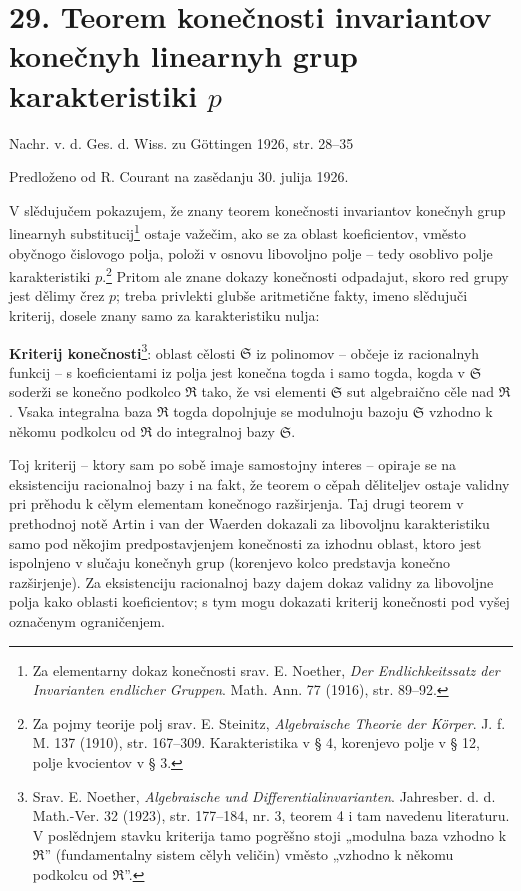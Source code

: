 \documentclass[11pt]{article}
\begin{document}
\section*{29. Teorem konečnosti invariantov konečnyh linearnyh grup karakteristiki $p$}

\begin{center}
Nachr. v. d. Ges. d. Wiss. zu Göttingen 1926, str. 28--35
\end{center}

Predloženo od R. Courant na zasědanju 30. julija 1926.

V slědujučem pokazujem, že znany teorem konečnosti invariantov konečnyh grup linearnyh substitucij\footnote{Za elementarny dokaz konečnosti srav. E. Noether, \emph{Der Endlichkeitssatz der Invarianten endlicher Gruppen}. Math. Ann. 77 (1916), str. 89--92.} ostaje važečim, ako se za oblast koeficientov, vměsto obyčnogo čislovogo polja, položi v osnovu libovoljno polje -- tedy osoblivo polje karakteristiki $p$.\footnote{Za pojmy teorije polj srav. E. Steinitz, \emph{Algebraische Theorie der Körper}. J. f. M. 137 (1910), str. 167--309. Karakteristika v § 4, korenjevo polje v § 12, polje kvocientov v § 3.} Pritom ale znane dokazy konečnosti odpadajut, skoro red grupy jest dělimy črez $p$; treba privlekti glubše aritmetične fakty, imeno slědujuči kriterij, dosele znany samo za karakteristiku nulja:

\textbf{Kriterij konečnosti}\footnote{Srav. E. Noether, \emph{Algebraische und Differentialinvarianten}. Jahresber. d. d. Math.-Ver. 32 (1923), str. 177--184, nr. 3, teorem 4 i tam navedenu literaturu. V poslědnjem stavku kriterija tamo pogrěšno stoji „modulna baza vzhodno k $\mathfrak R$” (fundamentalny sistem cělyh veličin) vměsto „vzhodno k někomu podkolcu od $\mathfrak R$”.}: oblast cělosti $\mathfrak S$ iz polinomov -- občeje iz racionalnyh funkcij -- s koeficientami iz polja jest konečna togda i samo togda, kogda v $\mathfrak S$ soderži se konečno podkolco $\mathfrak R$ tako, že vsi elementi $\mathfrak S$ sut algebraično cěle nad $\mathfrak R$. Vsaka integralna baza $\mathfrak R$ togda dopolnjuje se modulnoju bazoju $\mathfrak S$ vzhodno k někomu podkolcu od $\mathfrak R$ do integralnoj bazy $\mathfrak S$.

Toj kriterij -- ktory sam po sobě imaje samostojny interes -- opiraje se na eksistenciju racionalnoj bazy i na fakt, že teorem o cěpah děliteljev ostaje validny pri prěhodu k cělym elementam konečnogo razširjenja. Taj drugi teorem v prethodnoj notě Artin i van der Waerden dokazali za libovoljnu karakteristiku samo pod někojim predpostavjenjem konečnosti za izhodnu oblast, ktoro jest ispolnjeno v slučaju konečnyh grup (korenjevo kolco predstavja konečno razširjenje). Za eksistenciju racionalnoj bazy dajem dokaz validny za libovoljne polja kako oblasti koeficientov; s tym mogu dokazati kriterij konečnosti pod vyšej označenym ograničenjem.
\end{document}
